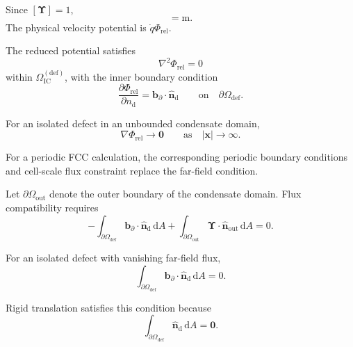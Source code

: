 Since $[\boldsymbol{\Upsilon}]=1$,
\begin{equation}
    [\Phi_{\mathrm{rel}}]
    =
    \mathrm{m}.
\end{equation}
The physical velocity potential is $\dot{q}\Phi_{\mathrm{rel}}$.

The reduced potential satisfies
\begin{equation}
    \nabla^2\Phi_{\mathrm{rel}}
    =
    0
\end{equation}
within $\Omega_{\mathrm{IC}}^{(\mathrm{def})}$, with the inner boundary condition
\begin{equation}
    \frac{\partial\Phi_{\mathrm{rel}}}{\partial n_{\mathrm{d}}}
    =
    \mathbf{b}_{\partial}
    \cdot
    \hat{\mathbf{n}}_{\mathrm{d}}
    \qquad
    \mathrm{on}
    \quad
    \partial\Omega_{\mathrm{def}}.
\end{equation}

For an isolated defect in an unbounded condensate domain,
\begin{equation}
    \nabla\Phi_{\mathrm{rel}}
    \rightarrow
    \mathbf{0}
    \qquad
    \mathrm{as}
    \quad
    |\mathbf{x}|
    \rightarrow
    \infty.
\end{equation}

For a periodic FCC calculation, the corresponding periodic boundary conditions and cell-scale flux constraint replace the far-field condition.

Let $\partial\Omega_{\mathrm{out}}$ denote the outer boundary of the condensate domain. Flux compatibility requires
\begin{equation}
    -
    \int_{\partial\Omega_{\mathrm{def}}}
    \mathbf{b}_{\partial}
    \cdot
    \hat{\mathbf{n}}_{\mathrm{d}}
    \,
    \mathrm{d}A
    +
    \int_{\partial\Omega_{\mathrm{out}}}
    \boldsymbol{\Upsilon}
    \cdot
    \hat{\mathbf{n}}_{\mathrm{out}}
    \,
    \mathrm{d}A
    =
    0.
\end{equation}

For an isolated defect with vanishing far-field flux,
\begin{equation}
    \int_{\partial\Omega_{\mathrm{def}}}
    \mathbf{b}_{\partial}
    \cdot
    \hat{\mathbf{n}}_{\mathrm{d}}
    \,
    \mathrm{d}A
    =
    0.
\end{equation}

Rigid translation satisfies this condition because
\begin{equation}
    \int_{\partial\Omega_{\mathrm{def}}}
    \hat{\mathbf{n}}_{\mathrm{d}}
    \,
    \mathrm{d}A
    =
    \mathbf{0}.
\end{equation}

